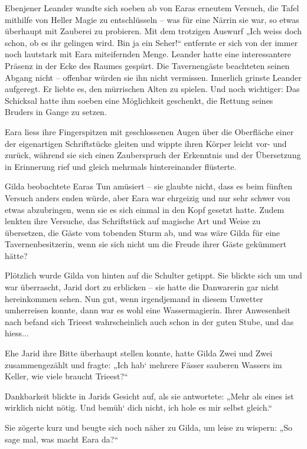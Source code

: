 \documentclass[10pt, a4paper, oneside]{book}
\begin{document}
Ebenjener Leander wandte sich soeben ab von Earas erneutem Versuch, die Tafel mithilfe von Heller Magie zu entschlüsseln – was für eine Närrin sie war, so etwas überhaupt mit Zauberei zu probieren. Mit dem trotzigen Auswurf „Ich weiss doch schon, ob es ihr gelingen wird. Bin ja ein Seher!“ entfernte er sich von der immer noch lautstark mit Eara miteifernden Menge. Leander hatte eine interessantere Präsenz in der Ecke des Raumes gespürt. Die Tavernengäste beachteten seinen Abgang nicht – offenbar würden sie ihn nicht vermissen. Innerlich grinste Leander aufgeregt. Er liebte es, den mürrischen Alten zu spielen. Und noch wichtiger: Das Schicksal hatte ihm soeben eine Möglichkeit geschenkt, die Rettung seines Bruders in Gange zu setzen.



Eara liess ihre Fingerspitzen mit geschlossenen Augen über die Oberfläche einer der eigenartigen Schriftstücke gleiten und wippte ihren Körper leicht vor- und zurück, während sie sich einen Zauberspruch der Erkenntnis und der Übersetzung in Erinnerung rief und gleich mehrmals hintereinander flüsterte.

Gilda beobachtete Earas Tun amüsiert – sie glaubte nicht, dass es beim fünften Versuch anders enden würde, aber Eara war ehrgeizig und nur sehr schwer von etwas abzubringen, wenn sie es sich einmal in den Kopf gesetzt hatte. Zudem lenkten ihre Versuche, das Schriftstück auf magische Art und Weise zu übersetzen, die Gäste vom tobenden Sturm ab, und was wäre Gilda für eine Tavernenbesitzerin, wenn sie sich nicht um die Freude ihrer Gäste gekümmert hätte?

Plötzlich wurde Gilda von hinten auf die Schulter getippt. Sie blickte sich um und war überrascht, Jarid dort zu erblicken – sie hatte die Danwarerin gar nicht hereinkommen sehen. Nun gut, wenn irgendjemand in diesem Unwetter umherreisen konnte, dann war es wohl eine Wassermagierin. Ihrer Anwesenheit nach befand sich Trieest wahrscheinlich auch schon in der guten Stube, und das hiess...

Ehe Jarid ihre Bitte überhaupt stellen konnte, hatte Gilda Zwei und Zwei zusammengezählt und fragte: „Ich hab‘ mehrere Fässer sauberen Wassers im Keller, wie viele braucht Trieest?“

Dankbarkeit blickte in Jarids Gesicht auf, als sie antwortete: „Mehr als eines ist wirklich nicht nötig. Und bemüh‘ dich nicht, ich hole es mir selbst gleich.“

Sie zögerte kurz und beugte sich noch näher zu Gilda, um leise zu wispern: „So sage mal, was macht Eara da?“
\end{document}
